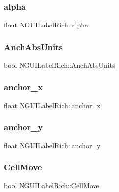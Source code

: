 \subsubsection{\texorpdfstring{alpha}{alpha}}
{\footnotesize\ttfamily float N\+G\+U\+I\+Label\+Rich\+::alpha}

\hypertarget{class_n_g_u_i_label_rich_a5086f44b8840056f0672637aebac422a}{}\label{class_n_g_u_i_label_rich_a5086f44b8840056f0672637aebac422a} 
\subsubsection{\texorpdfstring{Anch\+Abs\+Units}{AnchAbsUnits}}
{\footnotesize\ttfamily bool N\+G\+U\+I\+Label\+Rich\+::\+Anch\+Abs\+Units}

\hypertarget{class_n_g_u_i_label_rich_a15dd5666de75124cb8dd271e78cffa21}{}\label{class_n_g_u_i_label_rich_a15dd5666de75124cb8dd271e78cffa21} 
\subsubsection{\texorpdfstring{anchor\+\_\+x}{anchor\_x}}
{\footnotesize\ttfamily float N\+G\+U\+I\+Label\+Rich\+::anchor\+\_\+x}

\hypertarget{class_n_g_u_i_label_rich_a998c13eeebae659c6742945e3974fc8a}{}\label{class_n_g_u_i_label_rich_a998c13eeebae659c6742945e3974fc8a} 
\subsubsection{\texorpdfstring{anchor\+\_\+y}{anchor\_y}}
{\footnotesize\ttfamily float N\+G\+U\+I\+Label\+Rich\+::anchor\+\_\+y}

\hypertarget{class_n_g_u_i_label_rich_a32a68b1042ef2c5da520cb646cadb659}{}\label{class_n_g_u_i_label_rich_a32a68b1042ef2c5da520cb646cadb659} 
\subsubsection{\texorpdfstring{Cell\+Move}{CellMove}}
{\footnotesize\ttfamily bool N\+G\+U\+I\+Label\+Rich\+::\+Cell\+Move}

